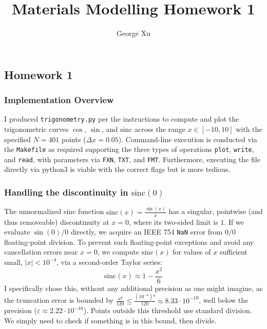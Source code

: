 \documentclass[12pt]{article}
\title{Materials Modelling Homework 1}
\author{George Xu}
\date{}
\numberwithin{equation}{subsection}
\begin{document}
\maketitle


\subsection*{Homework 1}\label{sec:}
\subsubsection*{Implementation Overview}
I produced \texttt{trigonometry.py} per the instructions to compute and plot the trigonometric curves $\cos$, $\sin$, and $\text{sinc}$ across the range $x ∈ [-10, 10]$ with the specified $N=401$ points ($Δ x = 0.05$). Command-line execution is conducted via the \texttt{Makefile} as required supporting the three types of operations \texttt{plot}, \texttt{write}, and \texttt{read}, with parameters via \texttt{FXN}, \texttt{TXT}, and \texttt{FMT}. Furthermore, executing the file directly via python3 is viable with the correct flags but is more tedious.

\subsubsection*{Handling the discontinuity in $\text{sinc}(0)$}
The unnormalized sinc function $\text{sinc}(x) = \frac{\sin(x)}{x}$ has a singular, pointwise (and thus removeable) discontinuity at $x=0$, where its two-sided limit is $1$. If we evaluate $\sin(0)/0$ directly, we acquire an IEEE 754 \texttt{NaN} error from $0/0$ floating-point division. To prevent such floating-point exceptions and avoid any cancellation errors near $x=0$, we compute $\text{sinc}(x)$ for values of $x$ sufficient small, $|x| < 10^{-4}$, via a second-order Taylor series:
\begin{equation}
\text{sinc}(x) ≈ 1 - \frac{x^2}{6}
\end{equation}
I specifically chose this, without any additional precision as one might imagine, as the truncation error is bounded by $\frac{x⁴}{120} ≤ \frac{(10^{-4})⁴}{120} ≈ 8.33 ⋅ 10^{-19}$, well below the precision ($ε≈ 2.22 ⋅ 10^{-16}$). Points outside this threshold use standard division. We simply need to check if something is in this bound, then divide.
\end{document}
